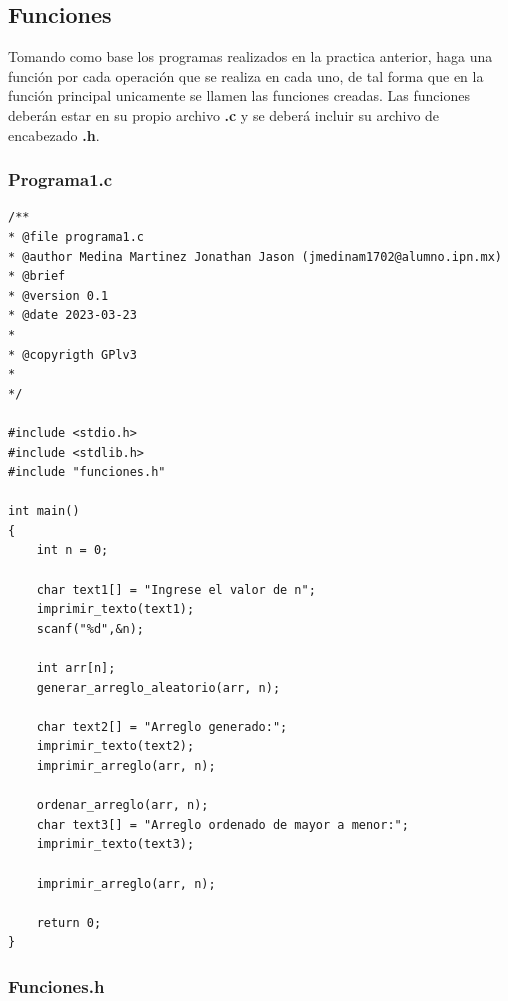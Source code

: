 \documentclass{article}
\begin{document}
	\subsection{Funciones}
	
	Tomando como base los programas realizados en la practica anterior, haga una función por cada operación que se realiza en cada uno, de tal forma que en la función principal unicamente se llamen las funciones creadas. Las funciones deberán estar en su propio archivo \textbf{.c} y se deberá incluir su archivo de encabezado \textbf{.h}.
	
	\subsubsection{Programa1.c}
	
	\begin{lstlisting}
/**
* @file programa1.c
* @author Medina Martinez Jonathan Jason (jmedinam1702@alumno.ipn.mx)
* @brief 
* @version 0.1
* @date 2023-03-23
* 
* @copyrigth GPlv3
* 
*/

#include <stdio.h>
#include <stdlib.h>
#include "funciones.h"

int main()
{
	int n = 0;
	
	char text1[] = "Ingrese el valor de n";
	imprimir_texto(text1);
	scanf("%d",&n);
	
	int arr[n];
	generar_arreglo_aleatorio(arr, n);
	
	char text2[] = "Arreglo generado:";
	imprimir_texto(text2);
	imprimir_arreglo(arr, n);
	
	ordenar_arreglo(arr, n);
	char text3[] = "Arreglo ordenado de mayor a menor:";
	imprimir_texto(text3);
	
	imprimir_arreglo(arr, n);
	
	return 0;
}
	\end{lstlisting}
	
	\newpage
	
	\subsubsection{Funciones.h}
	
\end{document}
